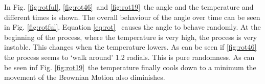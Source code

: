 
In Fig. \ref{fig:rotful}, \ref{fig:rot46}~and \ref{fig:rot19}~the angle and
the temperature and different times is shown. The overall behaviour of the
angle over time can be seen in Fig. \ref{fig:rotful}. Equation \ref{eq:rot}~
causes the angle to behave randomly. At the beginning of the process, where
the temperature is very high, the process is very instable. This changes when
the temperature lowers. As can be seen if \ref{fig:rot46} the process seems to
`walk around' 1.2 radials. This is pure randomness. As can be seen inf Fig.
\ref{fig:rot19}~the temperature finally cools down to a minimum the movement
of the Brownian Motion also diminishes.

